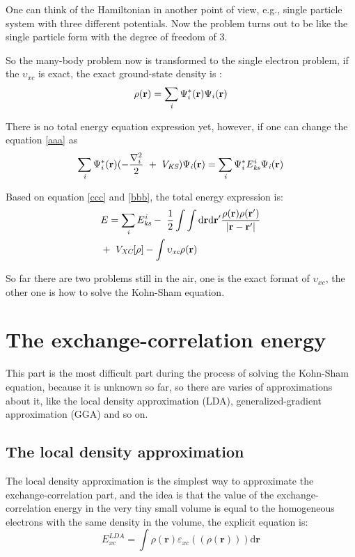 \documentclass[a4paper, 12pt, titlepage,oneside,drop]{kthesis}
\begin{document}
\noindent One can think of the Hamiltonian in another point of view, e.g., single particle system with three different potentials. Now the
 problem turns out to be like the single particle form with the degree of freedom of 3.

\noindent So the many-body problem now is transformed to the single electron problem, if the $\upsilon_\textit{xc}$  is exact, the exact ground-state density is :
\begin{equation}\label{ks1}
 \rho(\textbf{r}) = \sumi<i> {\Psi^{*}_{i}(\textbf{r})} {\Psi_{i}(\textbf{r})}
\end{equation}

\noindent There is no total energy equation expression yet, however, if one can change the equation \ref{aaa} as 
\begin{equation}\label{bbb}
\sumi<i> \Psi^{*}_{\textit{i}}(\textbf{r})(-\frac{\nabla^{2}_{i}}{2}\ + \ V_\textit{KS}) \Psi_{\textit{i}}(\textbf{r}) = \sumi<i> \Psi^{*}_{\textit{i}}E_{\textit{ks}}^{\textit{i}} \Psi_{\textit{i}}(\textbf{r})
\end{equation}

\noindent Based on equation \ref{ccc} and \ref{bbb}, the total energy expression is:
\begin{equation}\label{totalenergy}
\begin{split}
& E= \sumi<i> E_{\textit{ks}}^{\textit{i}} - \ \frac{1}{2} \int \int \mathrm{d} {\textbf{r}} \mathrm{d}{\textbf{r}^{\prime}} \frac{\rho({\textbf{r}})\rho(\textbf{r}^{\prime})}{|{\textbf{r}}-{\textbf{r}}^{\prime}|} \\
&    + \ V_\textit{XC}[\rho] - \int   \upsilon_\textit{xc} \rho({\textbf{r}})
\end{split}
\end{equation}

\noindent So far there are two problems still in the air, one is the exact format of $\upsilon_\textit{xc}$, the other one is how to solve the Kohn-Sham equation.

\section{The exchange-correlation energy}
\noindent This part is the most difficult part during the process of solving the Kohn-Sham equation, because it is unknown so far, so there
 are varies of approximations about it, like the local density approximation (LDA), generalized-gradient approximation (GGA) and
so on.
\subsection{The local density approximation}
\noindent The local density approximation is the simplest way to approximate the exchange-correlation part, and the idea is that the value 
of the exchange-correlation energy in the very tiny small volume is equal to the homogeneous electrons with the same density in 
the volume, the explicit equation is: 
\begin{equation}
 E^\textit{LDA}_\textit{xc} = \int \rho(\textbf{r}) \varepsilon_\textit{xc}( (\rho(\textbf{r})) ) \mathrm{d} \textbf{r} 
\end{equation}
\end{document}
